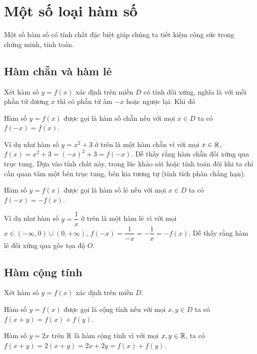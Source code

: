 \chapter{Một số loại hàm số}

Một số hàm số có tính chất đặc biệt giúp chúng ta tiết kiệm 
công sức trong chứng minh, tính toán.

\section{Hàm chẵn và hàm lẻ}

Xét hàm số $y=f(x)$ xác định trên miền $D$ có tính đối xứng, 
nghĩa là với mỗi phần tử dương $x$ thì có phần tử âm $-x$
hoặc ngược lại. Khi đó

\begin{definition}
    Hàm số $y=f(x)$ được gọi là hàm số chẵn nếu với mọi $x \in D$
    ta có $f(-x) = f(x)$.
\end{definition}

Ví dụ như hàm số $y = x^2 + 3$ ở trên là một hàm chẵn vì với mọi
$x \in \mathbb{R}$, $f(x) = x^2 + 3 = (-x)^2 + 3 = f(-x)$. Dễ thấy rằng
hàm chẵn đối xứng qua trục tung. Dựa vào tính chất này, 
trong lúc khảo sát hoặc tính toán đôi khi ta chỉ cần quan tâm 
một bên trục tung, bên kia tương tự (tính tích phân chẳng hạn).

\begin{definition}
    Hàm số $y=f(x)$ được gọi là hàm số lẻ nếu với mọi $x \in D$
    ta có $f(-x) = -f(x)$.
\end{definition}

Ví dụ như hàm số $y = \dfrac{1}{x}$ ở trên là một hàm lẻ vì với
mọi $x \in (-\infty, 0) \cup (0, +\infty)$, $f(-x) = \dfrac{1}{-x} = -\dfrac{1}{x} = 
-f(x)$. Dễ thấy rằng hàm lẻ đối xứng qua gốc tọa độ $O$.

\section{Hàm cộng tính}

Xét hàm số $y=f(x)$ xác định trên miền $D$. 

\begin{definition}
    Hàm số $y = f(x)$ được gọi là cộng tính nếu với mọi $x, y \in D$
    ta có $f(x+y) = f(x) + f(y)$.
\end{definition}

\begin{example}
    Hàm số $y = 2x$ trên $\mathbb{R}$ là hàm cộng tính vì với mọi $x, y \in \mathbb{R}$,
    ta có $f(x+y) = 2(x+y) = 2x + 2y = f(x) + f(y)$.
\end{example}

